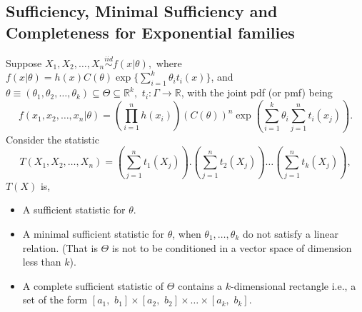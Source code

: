 \documentclass[a4paper,english,12pt]{article}
\begin{document}
\subsection{Sufficiency, Minimal Sufficiency and Completeness for Exponential families}
\begin{thm}
Suppose $X_1,X_2,\dots,X_n \overset{iid}{\sim} f(x|\theta),$ where $f(x|\theta)=h(x)C(\theta)\exp\{\sum \limits_{i=1}^k\theta_i t_i(x)\}$, and $\theta\equiv(\theta_1,\theta_2,\dots,\theta_k)\subseteq\Theta\subseteq\mathbb{R}^k, \,\, t_i:\Gamma\rightarrow\mathbb{R}$,
with the joint pdf (or pmf) being 
\begin{equation*}
f(x_1,x_2,\dots,x_n|\theta)=\left(\prod\limits_{i=1}^n h(x_i)\right) \left(C(\theta)\right)^n \exp\left(\sum\limits_{i=1}^k \theta_i \sum\limits_{j=1}^n t_i(x_j) \right).
\end{equation*}
Consider the statistic 
\begin{equation*}
T(X_1,X_2,\dots,X_n)= \left(\sum_{j=1}^n t_1(X_j)\right).\left(\sum_{j=1}^n t_2(X_j)\right)\dots \left(\sum_{j=1}^n t_k(X_j)\right),
\end{equation*}
$T(X)$ is,
\begin{itemize}
\item A sufficient statistic for  $\theta$.
\item A minimal sufficient statistic for $\theta$, when $\theta_1,\dots,\theta_k$ do not satisfy a linear relation. (That is $\Theta$ is not to be conditioned in a vector space of dimension less than $k$).
\item A complete sufficient statistic of $\Theta$ contains a $k$-dimensional rectangle i.e., a set of the form $[a_1,\,\, b_1]\times[a_2, \,\, b_2]\times\dots\times[a_k, \,\, b_k]$.
\end{itemize}
\end{thm}
\end{document}
